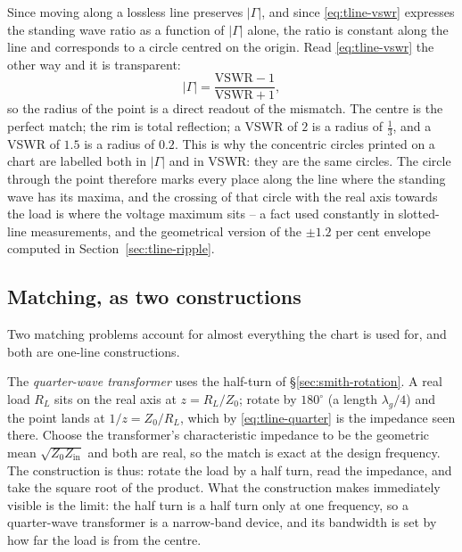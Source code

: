 Since moving along a lossless line preserves $|\Gamma|$, and since \eqref{eq:tline-vswr} expresses the standing
wave ratio as a function of $|\Gamma|$ alone, the ratio is constant along the line and corresponds to a circle
centred on the origin. Read \eqref{eq:tline-vswr} the other way and it is transparent:
\begin{equation}
  |\Gamma| = \frac{\mathrm{VSWR}-1}{\mathrm{VSWR}+1} ,
  \label{eq:smith-vswr}
\end{equation}
so the radius of the point is a direct readout of the mismatch. The centre is the perfect match; the rim is total
reflection; a VSWR of $2$ is a radius of $\tfrac13$, and a VSWR of $1.5$ is a radius of $0.2$. This is why the
concentric circles printed on a chart are labelled both in $|\Gamma|$ and in VSWR: they are the same circles. The
circle through the point therefore marks every place along the line where the standing wave has its maxima, and
the crossing of that circle with the real axis towards the load is where the voltage maximum sits -- a fact used
constantly in slotted-line measurements, and the geometrical version of the $\pm1.2$ per cent envelope computed in
Section~\ref{sec:tline-ripple}.

\subsection{Matching, as two constructions}
\label{sec:smith-matching}

Two matching problems account for almost everything the chart is used for, and both are one-line constructions.

The \emph{quarter-wave transformer} uses the half-turn of \S\ref{sec:smith-rotation}. A real load $R_L$ sits on
the real axis at $z=R_L/Z_0$; rotate by $180^\circ$ (a length $\lambda_g/4$) and the point lands at $1/z=Z_0/R_L$,
which by \eqref{eq:tline-quarter} is the impedance seen there. Choose the transformer's characteristic impedance
to be the geometric mean $\sqrt{Z_0 Z_{\mathrm{in}}}$ and both are real, so the match is exact at the design
frequency. The construction is thus: rotate the load by a half turn, read the impedance, and take the square root
of the product. What the construction makes immediately visible is the limit: the half turn is a half turn only at
one frequency, so a quarter-wave transformer is a narrow-band device, and its bandwidth is set by how far the load
is from the centre.

